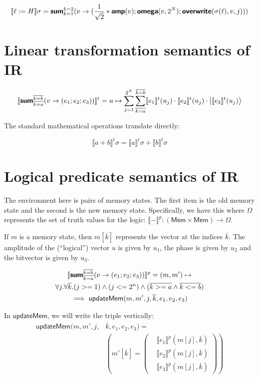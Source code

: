 \documentclass[runningheads]{llncs}
\newcommand {\ra} {\rightarrow}
\newcommand {\sem} [1] {\llbracket #1 \rrbracket}
\newcommand {\Psem} [1] {\sem{#1}^p}
\newcommand {\Tsem} [1] {\sem{#1}^t}
\newcommand {\Mem} {\textsf{Mem}}
\newcommand {\ket}[1]{\ensuremath{\left|#1\right\rangle}}
\newcommand {\ir} [1] {\textsf{\textbf{#1}}}
\newcommand {\irSum} {\ir{sum}}
\newcommand {\irOverwrite} {\ir{overwrite}}
\newcommand {\irAmp} {\ir{amp}}
\newcommand {\irOmega} {\ir{omega}}
\newcommand {\updateMem} {\textsf{updateMem}}
\newcommand {\truthVals} {\Omega}
\begin{document}
\[
  \sem{\ell := H}\sigma = \irSum_{k=1}^{k=2}(v \rightarrow (\frac{1}{\sqrt{2}} * \irAmp(v); \irOmega(v, 2^N); \irOverwrite(\sigma(\ell), v, j)))
\]

\section{Linear transformation semantics of IR}

\[
  \Tsem{\irSum_{\overline{k=a}}^{\overline{k=b}} (v \rightarrow (e_1; e_2; e_3))} = u \mapsto \sum_{j=1}^{2^N}\sum_{\overline{k=a}}^{\overline{k=b}} \Tsem{e_1}(u_j) \cdot \Tsem{e_2}(u_j) \cdot \ket{\Tsem{e_3}(u_j)}
\]

\noindent
The standard mathematical operations translate directly:

\[
  \Tsem{a + b}\sigma = \Tsem{a}\sigma + \Tsem{b}\sigma
\]

\section{Logical predicate semantics of IR}

The environment here is pairs of memory states. The first item is the old memory state and the second is the new memory state. Specifically, we have this where $\truthVals$ represents the set of truth values for the logic: $\Psem{-} : (\Mem \times \Mem) \ra \truthVals$.

If $m$ is a memory state, then $m[\overline{k}]$ represents the vector at the indices $\overline{k}$. The amplitude of the (``logical'') vector $u$ is given by $u_1$, the phase is given by $u_2$ and the bitvector is given by $u_3$.

\begin{multline*}
  \Psem{\irSum_{\overline{k=a}}^{\overline{k=b}} (v \rightarrow (e_1; e_2; e_3))} = (m, m') \mapsto \\
    \forall j. \forall \overline{k}. (j >= 1) \land (j <= 2^n) \land (\overline{k >= a} \land \overline{k <= b})\\
    \implies \updateMem(m, m', j, \overline{k}, e_1, e_2, e_3)
\end{multline*}

In $\updateMem$, we will write the triple vertically:\\

\[
\begin{aligned}
  \updateMem(m, m', j, &\overline{k}, e_1, e_2, e_3) =\\
    &\left(m'[\overline{k}] = \left(\begin{aligned}
                          &\Psem{e_1}(m[j], \overline{k})\\
                          &\Psem{e_2}(m[j], \overline{k})\\
                          &\Psem{e_3}(m[j], \overline{k})
    \end{aligned}\right)\right)
\end{aligned}
\]
\end{document}
